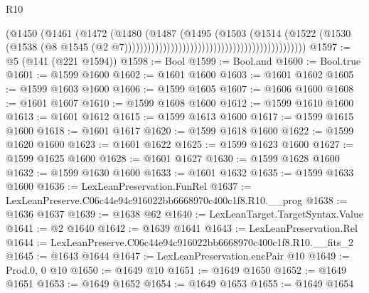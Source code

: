 \begin{lexlean}{R10}
\begin{coremodule}
                                                                        (@1450
                                                                          (@1461
                                                                            (@1472
                                                                              (@1480
                                                                                (@1487
                                                                                  (@1495
                                                                                    (@1503
                                                                                      (@1514
                                                                                        (@1522
                                                                                          (@1530
                                                                                            (@1538
                                                                                              (@8
                                                                                                @1545
                                                                                                (@2
                                                                                                  @7)))))))))))))))))))))))))))))))))))))))))))))))
@1597 := @5 (@141 (@221 @1594))
@1598 := Bool
@1599 := Bool.and
@1600 := Bool.true
@1601 := @1599 @1600
@1602 := @1601 @1600
@1603 := @1601 @1602
@1605 := @1599 @1603 @1600
@1606 := @1599 @1605
@1607 := @1606 @1600
@1608 := @1601 @1607
@1610 := @1599 @1608 @1600
@1612 := @1599 @1610 @1600
@1613 := @1601 @1612
@1615 := @1599 @1613 @1600
@1617 := @1599 @1615 @1600
@1618 := @1601 @1617
@1620 := @1599 @1618 @1600
@1622 := @1599 @1620 @1600
@1623 := @1601 @1622
@1625 := @1599 @1623 @1600
@1627 := @1599 @1625 @1600
@1628 := @1601 @1627
@1630 := @1599 @1628 @1600
@1632 := @1599 @1630 @1600
@1633 := @1601 @1632
@1635 := @1599 @1633 @1600
@1636 := LexLeanPreservation.FunRel
@1637 := LexLeanPreserve.C06c44e94c916022bb6668970c400c1f8.R10.__prog
@1638 := @1636 @1637
@1639 := @1638 @62
@1640 := LexLeanTarget.TargetSyntax.Value
@1641 := @2 @1640
@1642 := @1639 @1641
@1643 := LexLeanPreservation.Rel
@1644 := LexLeanPreserve.C06c44e94c916022bb6668970c400c1f8.R10.__fits_2
@1645 := @1643 @1644
@1647 := LexLeanPreservation.encPair @10
@1649 := Prod.{0, 0} @10
@1650 := @1649 @10
@1651 := @1649 @1650
@1652 := @1649 @1651
@1653 := @1649 @1652
@1654 := @1649 @1653
@1655 := @1649 @1654

\end{coremodule}
\end{lexlean}
